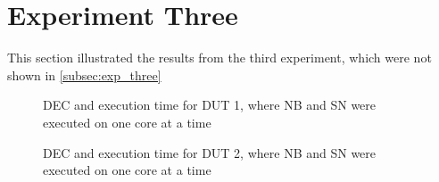 \section{Experiment Three}\label{app:exp_three}

This section illustrated the results from the third experiment, which were not shown in \cref{subsec:exp_three}


\begin{figure}[H]
    \centering
    \begin{subfigure}[b]{0.4\textwidth}
        \centering
        
    \end{subfigure}
    \hfill
    \begin{subfigure}[b]{0.4\textwidth}
        \centering
        
    \end{subfigure}
    \caption{DEC and execution time for DUT 1, where NB and SN were executed on one core at a time}
\end{figure}

\begin{figure}[H]
    \centering
    \begin{subfigure}[b]{0.4\textwidth}
        \centering
        
    \end{subfigure}
    \hfill
    \begin{subfigure}[b]{0.4\textwidth}
        \centering
        
    \end{subfigure}
    \caption{DEC and execution time for DUT 2, where NB and SN were executed on one core at a time}
\end{figure}


% 


% 

% 

